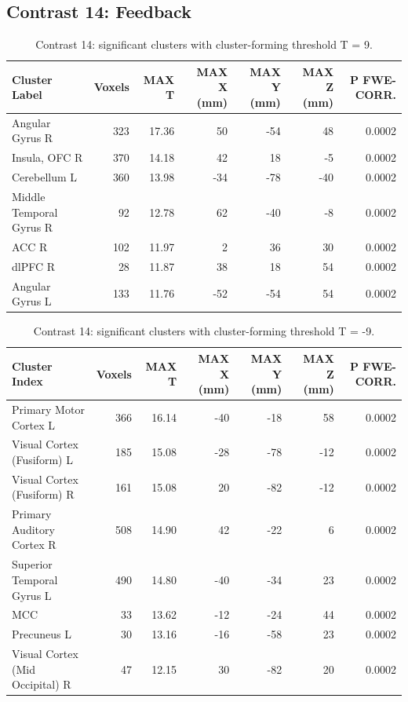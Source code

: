 \subsection{Contrast 14: Feedback}

\begin{table}[htbp]
    \centering
    \begin{threeparttable}
    \caption{Contrast 14: significant clusters with cluster-forming threshold T = 9.}
    \begin{tabularx}{\textwidth}{l *{6}{R}}
        \toprule
        \textbf{Cluster Label} & \textbf{Voxels} & \textbf{MAX T} & \textbf{MAX X (mm)} & \textbf{MAX Y (mm}) & \textbf{MAX Z (mm)} & \textbf{P FWE-CORR.} \\
        \midrule
        Angular Gyrus R & 323 & 17.36 & 50 & -54 & 48 & 0.0002 \\
Insula, OFC R & 370 & 14.18 & 42 & 18 & -5 & 0.0002 \\
Cerebellum L & 360 & 13.98 & -34 & -78 & -40 & 0.0002 \\
Middle Temporal Gyrus R & 92 & 12.78 & 62 & -40 & -8 & 0.0002 \\
ACC R & 102 & 11.97 & 2 & 36 & 30 & 0.0002 \\
dlPFC R & 28 & 11.87 & 38 & 18 & 54 & 0.0002 \\
Angular Gyrus L & 133 & 11.76 & -52 & -54 & 54 & 0.0002 \\
        \bottomrule
        \end{tabularx}
        \end{threeparttable}
        \label{tab:con14_pos}%
\end{table}%

\begin{table}[htbp]
    \centering
    \begin{threeparttable}
    \caption{Contrast 14: significant clusters with cluster-forming threshold T = -9.}
    \begin{tabularx}{\textwidth}{l *{6}{R}}
        \toprule
        \textbf{Cluster Index} & \textbf{Voxels} & \textbf{MAX T} & \textbf{MAX X (mm)} & \textbf{MAX Y (mm}) & \textbf{MAX Z (mm)} & \textbf{P FWE-CORR.} \\
        \midrule
       Primary Motor Cortex L & 366 & 16.14 & -40 & -18 & 58 & 0.0002 \\
Visual Cortex (Fusiform) L & 185 & 15.08 & -28 & -78 & -12 & 0.0002 \\
Visual Cortex (Fusiform) R & 161 & 15.08 & 20 & -82 & -12 & 0.0002 \\
Primary Auditory Cortex R & 508 & 14.90 & 42 & -22 & 6 & 0.0002 \\
Superior Temporal Gyrus L & 490 & 14.80 & -40 & -34 & 23 & 0.0002 \\
MCC & 33 & 13.62 & -12 & -24 & 44 & 0.0002 \\
Precuneus L & 30 & 13.16 & -16 & -58 & 23 & 0.0002 \\
Visual Cortex (Mid Occipital) R & 47 & 12.15 & 30 & -82 & 20 & 0.0002 \\
        \bottomrule
        \end{tabularx}
        \end{threeparttable}
        \label{tab:con14_neg}%
\end{table}%